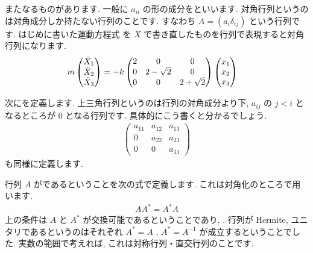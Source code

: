 \documentclass[openany, a4paper, oneside]{book}
\theoremstyle{break}
\theoremstyle{breakdefn}
\begin{document}
またなるものがあります.
一般に $a_{ii}$ の形の成分をといいます.
対角行列というのは対角成分しか持たない行列のことです.
すなわち $A = (a_{i} \delta _{ij} )$ という行列です. はじめに書いた運動方程式
を $X$ で書き直したものを行列で表現すると対角行列になります.
    \begin{align}
        m \begin{pmatrix} \ddot{X}_{1} \\ \ddot{X}_{2} \\ \ddot{X}_{3} \end{pmatrix}
        &= -k \begin{pmatrix} 2 & 0 & 0 \\ 0 & 2- \sqrt{2} & 0 \\ 0 & 0 & 2 + \sqrt{2} \end{pmatrix}
        \begin{pmatrix} x_{1} \\ x_{2} \\ x_{3} \end{pmatrix} \notag
    \end{align}

次にを定義します.
上三角行列というのは行列の対角成分より下,  $a_{ij}$ の $j< i$ となるところが
 $0$ となる行列です. 具体的にこう書くと分かるでしょう.
    \begin{align}
        \begin{pmatrix} a_{11} & a_{12} & a_{13} \\
                        0 & a_{22} & a_{23} \\
                        0 & 0 & a_{33}
        \end{pmatrix}
    \end{align}
も同様に定義します.

行列 $A$ がであるということを次の式で定義します.
これは対角化のところで用います.
    \begin{align}
        AA^{*} = A^{*}A
    \end{align}
上の条件は $A$ と $A^{*}$ が交換可能であるということであり, . 行列が Hermite, ユニタリであるというのはそれぞれ $A^{*}=A$ ,  $A^{*} = A^{-1}$ が成立するということでした.
実数の範囲で考えれば, これは対称行列・直交行列のことです.
\end{document}
